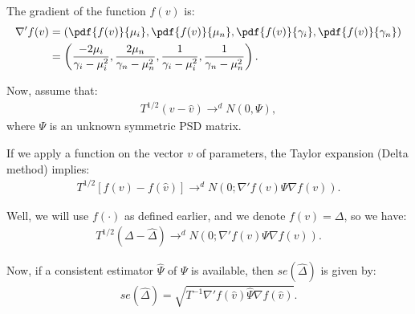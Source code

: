 \documentclass[12pt,oneside,a4paper]{article}
\begin{document}
The gradient of the function $f(v)$ is:
\begin{align}
\nabla' f(v) &=
\left( 
\pdf{f(v)}{\mu_{i}},
\pdf{f(v)}{\mu_{n}},
\pdf{f(v)}{\gamma_{i}},
\pdf{f(v)}{\gamma_{n}}
\right)
\\ &=
\left( 
\frac{-2 \mu_{i}}{\gamma_{i} - \mu_{i}^2},
\frac{2 \mu_{n}}{\gamma_{n} - \mu_{n}^2},
\frac{1}{\gamma_{i} - \mu_{i}^2},  
\frac{1}{\gamma_{n} - \mu_{n}^2}
\right).
\end{align}

Now, assume that:
\begin{align}
	T^{1/2}(v - \hat{v}) \to^d N(0, \Psi),
\end{align}
where $\Psi$ is an unknown symmetric PSD matrix.

If we apply a function on the vector $v$ of parameters, the Taylor expansion (Delta method) implies:
\begin{align*}
	T^{1/2}[f(v) - f(\hat{v})] \to^d N \left( 0; \nabla'f(v) \Psi \nabla f(v)  \right).
\end{align*}

Well, we will use $f(\cdot)$ as defined earlier, and we denote $f(v) = \Delta$, so we have:
\begin{align*}
T^{1/2}(\Delta - \hat{\Delta}) 	\to^d N \left( 0; \nabla'f(v) \Psi \nabla f(v)  \right).
\end{align*}

Now, if a consistent estimator $\hat{\Psi}$ of $\Psi$ is available, then $se(\hat{\Delta})$ is given by:
\begin{align}
	se(\hat{\Delta}) = \sqrt{T^{-1} \nabla'f(\hat{v}) \hat{\Psi} \nabla f(\hat{v})}.
\end{align}

\clearpage
\renewcommand\bibname{REFERENCES} 


\end{document}
